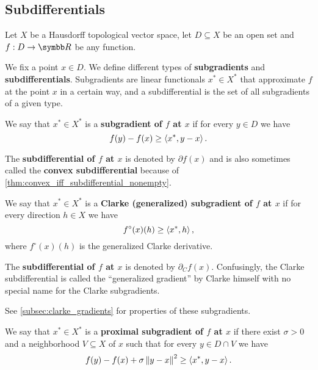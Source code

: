 \subsection{Subdifferentials}\label{subsec:subdifferentials}

Let \( X \) be a Hausdorff topological vector space, let \( D \subseteq X \) be an open set and \( f: D \to \R \) be any function.

\begin{definition}\label{def:subdifferentials}
  We fix a point \( x \in D \). We define different types of \textbf{subgradients} and \textbf{subdifferentials}. Subgradients are linear functionals \( x^* \in X^* \) that approximate \( f \) at the point \( x \) in a certain way, and a subdifferential is the set of all subgradients of a given type.

  \begin{defenum}
    \cite[59]{Clarke2013} We say that \( x^* \in X^* \) is a \textbf{subgradient of \( f \) at \( x \)} if for every \( y \in D \) we have
    \begin{equation*}
      f(y) - f(x) \geq \left\langle x^*, y - x \right\rangle.
    \end{equation*}

    The \textbf{subdifferential of \( f \) at \( x \)} is denoted by \( \partial f(x) \) and is also sometimes called the \textbf{convex subdifferential} because of \cref{thm:convex_iff_subdifferential_nonempty}.

    \cite[definition 10.3]{Clarke2013} We say that \( x^* \in X^* \) is a \textbf{Clarke (generalized) subgradient of \( f \) at \( x \)} if for every direction \( h \in X \) we have
    \begin{equation*}
      f^\circ(x)(h) \geq \left\langle x^*, h \right\rangle,
    \end{equation*}
    where \( f^\circ(x)(h) \) is the generalized Clarke derivative.

    The \textbf{subdifferential of \( f \) at \( x \)} is denoted by \( \partial_C f(x) \). Confusingly, the Clarke subdifferential is called the \enquote{generalized gradient} by Clarke himself with no special name for the Clarke subgradients.

    See \cref{subsec:clarke_gradients} for properties of these subgradients.

    \cite[227]{Clarke2013} We say that \( x^* \in X^* \) is a \textbf{proximal subgradient of \( f \) at \( x \)} if there exist \( \sigma > 0 \) and a neighborhood \( V \subseteq X \) of \( x \) such that for every \( y \in D \cap V \) we have
    \begin{equation*}
      f(y) - f(x) + \sigma \left\Vert y - x \right\Vert^2 \geq \left\langle x^*, y - x \right\rangle.
    \end{equation*}


\end{defenum}
\end{definition}
